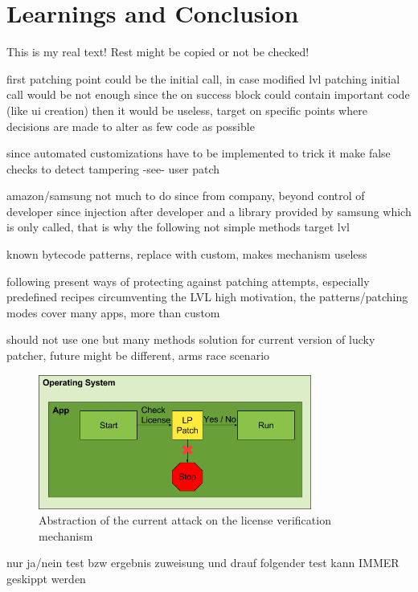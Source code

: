 \section{Learnings and Conclusion} \label{section:luckypatcher-learnings}
This is my real text! Rest might be copied or not be checked!

%
first patching point could be the initial call, in case modified lvl patching initial call would be not enough since the on success block could contain important code (like ui creation) then it would be useless, target on specific points where decisions are made to alter as few code as possible

since automated customizations have to be implemented to trick it
make false checks to detect tampering -see- user patch

amazon/samsung not much to do since from company, beyond control of developer since injection after developer and a library provided by samsung which is only called, that is why the following not simple methods target lvl

known bytecode patterns, replace with custom, makes mechanism useless

following present ways of protecting against patching attempts, especially predefined recipes circumventing the LVL
high motivation, the patterns/patching modes cover many apps, more than custom

should not use one but many methods
solution for current version of lucky patcher, future might be different, arms race scenario
\cite{munteanLicense}
%

\begin{figure}[h]
    \centering
    \includegraphics[width=0.8\textwidth]{data/verificationNowAttack.png}
    \caption{Abstraction of the current attack on the license verification mechanism}
    \label{fig:verificationNowAttack}
\end{figure}

nur ja/nein test bzw ergebnis zuweisung und drauf folgender test kann IMMER geskippt werden
